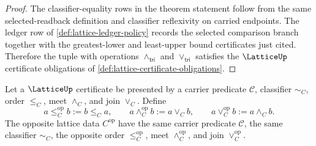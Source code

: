 \begin{proof}
The classifier-equality rows in the theorem statement follow from the same selected-readback definition and classifier reflexivity on carried endpoints. The ledger row of \autoref{def:lattice-ledger-policy} records the selected comparison branch together with the greatest-lower and least-upper bound certificates just cited. Therefore the tuple with operations $\wedge_{\mathsf{tri}}$ and $\vee_{\mathsf{tri}}$ satisfies the $\LatticeUp$ certificate obligations of \autoref{def:lattice-certificate-obligations}.
\end{proof}

\begin{definition}
\label{def:opposite-lattice-certificate-data}
Let a $\LatticeUp$ certificate be presented by a carrier predicate $\mathcal C$, classifier $\sim_C$, order $\le_C$, meet $\wedge_C$, and join $\vee_C$. Define
$$
a\le_C^{\mathrm{op}} b:=b\le_C a,
\qquad
a\wedge_C^{\mathrm{op}} b:=a\vee_C b,
\qquad
a\vee_C^{\mathrm{op}} b:=a\wedge_C b.
$$
The opposite lattice data $C^{\mathrm{op}}$ have the same carrier predicate $\mathcal C$, the same classifier $\sim_C$, the opposite order $\le_C^{\mathrm{op}}$, meet $\wedge_C^{\mathrm{op}}$, and join $\vee_C^{\mathrm{op}}$.
\end{definition}

